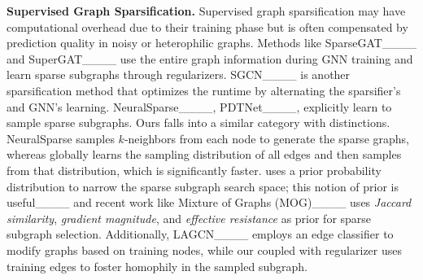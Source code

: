 
\noindent\textbf{Supervised Graph Sparsification.}
Supervised graph sparsification may have computational overhead due to their training phase but is often compensated by prediction quality in noisy or heterophilic graphs. Methods like SparseGAT____ and SuperGAT____ use the entire graph information during GNN training and learn sparse subgraphs through regularizers. 
SGCN____ is another sparsification method that optimizes the runtime by alternating the sparsifier's and GNN's learning. 
NeuralSparse____, PDTNet____, explicitly learn to sample sparse subgraphs. Ours \sgs falls into a similar category with distinctions. NeuralSparse samples $k$-neighbors from each node to generate the sparse graphs, whereas \sgs globally learns the sampling distribution of all edges and then samples from that distribution, which is significantly faster. 
\sgs uses a prior probability distribution to narrow the sparse subgraph search space; this notion of prior is useful____ and recent work like Mixture of Graphs (MOG)____ uses \textit{Jaccard similarity}, \textit{gradient magnitude}, and \textit{effective resistance} as prior for sparse subgraph selection.
Additionally, LAGCN____ employs an edge classifier to modify graphs based on training nodes, while our \edgemlp coupled with regularizer uses training edges to foster homophily in the sampled subgraph.
%
%
%
%
% 
